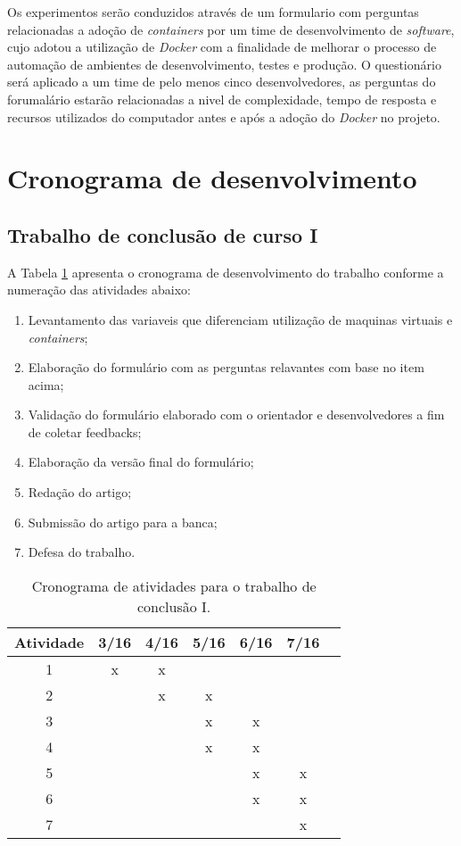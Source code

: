 \documentclass[11pt,a4paper]{article}
\begin{document}
Os experimentos serão conduzidos através de um formulario com perguntas relacionadas a adoção de \textit{containers} por um time
de desenvolvimento de \textit{software}, cujo adotou a utilização de \textit{Docker} com a finalidade de melhorar o processo de automação
de ambientes de desenvolvimento, testes e produção. O questionário será aplicado a um time de pelo menos cinco desenvolvedores,
as perguntas do forumalário estarão relacionadas a nivel de complexidade, tempo de resposta e recursos utilizados do computador
antes e após a adoção do \textit{Docker} no projeto.

\section{Cronograma de desenvolvimento}\label{sec:cronograma}

\subsection{Trabalho de conclusão de curso I}

A Tabela \ref{tab:cronograma1} apresenta o cronograma de desenvolvimento do trabalho conforme a numeração das atividades abaixo:
\begin{enumerate}
  \item Levantamento das variaveis que diferenciam utilização de maquinas virtuais e \textit{containers};
  \item Elaboração do formulário com as perguntas relavantes com base no item acima;
  \item Validação do formulário elaborado com o orientador e desenvolvedores a fim de coletar feedbacks;
  \item Elaboração da versão final do formulário;
  \item Redação do artigo;
  \item Submissão do artigo para a banca;
  \item Defesa do trabalho.
\end{enumerate}

\begin{table}[h]
  \begin{center}
    \caption{Cronograma de atividades para o trabalho de conclusão I. \label{tab:cronograma1}}
    \begin{tabular}{|c|c|c|c|c|c|c|}
      \hline
      \bf Atividade & \bf 3/16 & \bf 4/16 & \bf 5/16 & \bf 6/16 & \bf 7/16 \\  \hline \hline
      1 & x & x &   &   &   \\ \hline
      2 &   & x & x &   &   \\ \hline
      3 &   &   & x & x &   \\ \hline
      4 &   &   & x & x &   \\ \hline
      5 &   &   &   & x & x \\ \hline
      6 &   &   &   & x & x \\ \hline
      7 &   &   &   &   & x \\ \hline
    \end{tabular}
  \end{center}
\end{table}
\end{document}
